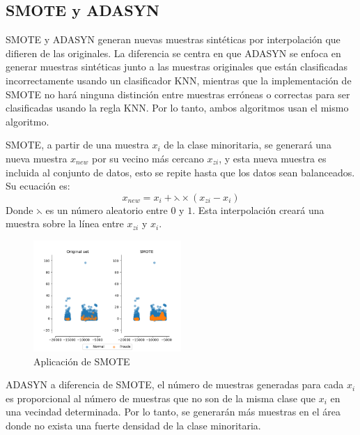   \subsection{SMOTE y ADASYN}
  
    SMOTE y ADASYN generan nuevas muestras sint\'{e}ticas por interpolaci\'{o}n que difieren de las originales. La diferencia se centra en que ADASYN se enfoca en generar muestras sint\'{e}ticas junto a las muestras originales que est\'{a}n clasificadas incorrectamente usando un clasificador KNN, mientras que la implementaci\'{o}n de SMOTE no har\'{a} ninguna distinci\'{o}n entre muestras err\'{o}neas o correctas para ser clasificadas usando la regla KNN. Por lo tanto, ambos algoritmos usan el mismo algoritmo.
    
    SMOTE, a partir de una muestra $x_{i}$ de la clase minoritaria, se generar\'{a} una nueva muestra $x_{new}$ por su vecino m\'{a}s cercano $x_{zi}$, y esta nueva muestra es incluida al conjunto de datos, esto se repite hasta que los datos sean balanceados. Su ecuaci\'{o}n es:
    \begin{equation}
    	x_{new}=x_{i}+\leftthreetimes \times (x_{zi}-x_{i})
    \end{equation}
    Donde $\leftthreetimes$ es un n\'{u}mero aleatorio entre $0$ y $1$. Esta interpolaci\'{o}n crear\'{a} una muestra sobre la l\'{i}nea entre $x_{zi}$ y $x_{i}$.
    
    \begin{figure}[h!]
    	\centering
    	\includegraphics[width=0.5\textwidth]{"figuras/Fig10"}
    	\caption{Aplicaci\'{o}n de SMOTE}
    \end{figure}

    ADASYN a diferencia de SMOTE, el n\'{u}mero de muestras generadas para cada $x_{i}$ es proporcional al n\'{u}mero de muestras que no son de la misma clase que $x_{i}$ en una vecindad determinada. Por lo tanto, se generar\'{a}n m\'{a}s muestras en el \'{a}rea donde no exista una fuerte densidad de la clase minoritaria.
    
